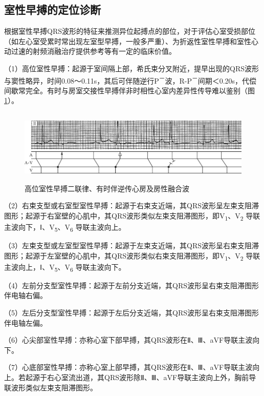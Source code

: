 \protect\hypertarget{text00018.htmlux5cux23subid152}{}{}

\subsection{室性早搏的定位诊断}

根据室性早搏QRS波形的特征来推测异位起搏点的部位，对于评估心室受损部位（如左心室受累时常出现左室型早搏，一般多严重）、为折返性室性早搏和室性心动过速的射频消融治疗提供参考等有一定的临床价值。

（1）高位室性早搏：起源于室间隔上部，希氏束分叉附近，提早出现的QRS波形与窦性略异，时间0.08～0.11s，其后可伴随逆行P\textsuperscript{－}波，R-P\textsuperscript{－}间期＜0.20s，代偿间歇常完全。有时与房室交接性早搏伴非时相性心室内差异性传导难以鉴别（图\ref{fig11-19}）。

\begin{figure}[!htbp]
 \centering
 \includegraphics[width=5.75in,height=1.38542in]{./images/Image00179.jpg}
 \captionsetup{justification=centering}
 \caption{高位室性早搏二联律、有时伴逆传心房及房性融合波}
 \label{fig11-19}
  \end{figure} 

（2）右束支型或右室型室性早搏：起源于右束支近端，其QRS波形呈左束支阻滞图形；起源于右室壁的心肌中，其QRS波形类似左束支阻滞图形，即V\textsubscript{1}、V\textsubscript{2} 导联主波向下，Ⅰ、V\textsubscript{5}、V\textsubscript{6} 导联主波向上。

（3）左束支型或左室型室性早搏：起源于左束支近端，其QRS波形呈右束支阻滞图形；起源于左室壁的心肌中，其QRS波形类似右束支阻滞图形，即V\textsubscript{1}、V\textsubscript{2} 导联主波向上，Ⅰ、V\textsubscript{5}、V\textsubscript{6} 导联主波向下。

（4）左前分支型室性早搏：起源于左前分支近端，其QRS波形呈右束支阻滞图形伴电轴右偏。

（5）左后分支型室性早搏：起源于左后分支近端，其QRS波形呈右束支阻滞图形伴电轴左偏。

（6）心尖部室性早搏：亦称心室下部早搏，其QRS波形在Ⅱ、Ⅲ、aVF导联主波向下。

（7）心底部室性早搏：亦称心室上部早搏，其QRS波形在Ⅱ、Ⅲ、aVF导联主波向上。若起源于右心室流出道，其QRS波形除Ⅱ、Ⅲ、aVF导联主波向上外，胸前导联波形类似左束支阻滞图形。

